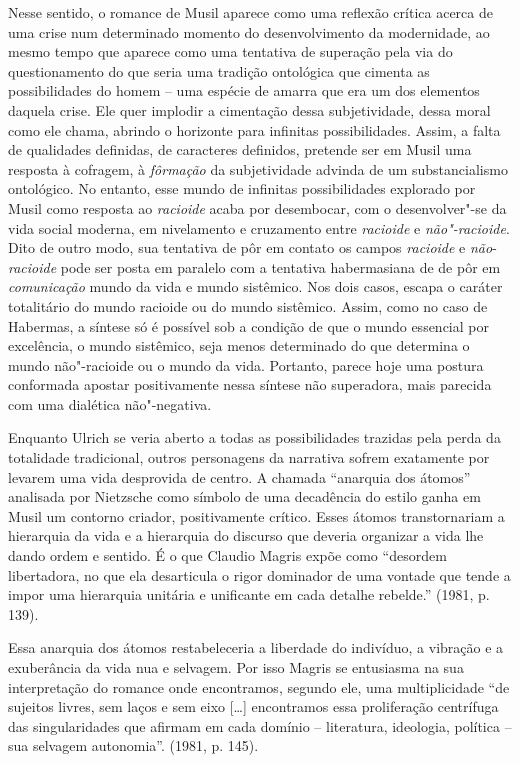 Nesse sentido, o romance de Musil aparece como uma reflexão crítica
acerca de uma crise num determinado momento do desenvolvimento da
modernidade, ao mesmo tempo que aparece como uma tentativa de superação
pela via do questionamento do que seria uma tradição ontológica que
cimenta as possibilidades do homem -- uma espécie de amarra que era um
dos elementos daquela crise. Ele quer implodir a cimentação dessa
subjetividade, dessa moral como ele chama, abrindo o horizonte para
infinitas possibilidades. Assim, a falta de qualidades definidas, de
caracteres definidos, pretende ser em Musil uma resposta à cofragem, à
\emph{fôrmação} da subjetividade advinda de um substancialismo
ontológico. No entanto, esse mundo de infinitas possibilidades explorado
por Musil como resposta ao \emph{racioide} acaba por desembocar, com o
desenvolver"-se da vida social moderna, em nivelamento e cruzamento entre
\emph{racioide} e \emph{não"-racioide}. Dito de outro modo, sua tentativa
de pôr em contato os campos \emph{racioide} e \emph{não}-\emph{racioide}
pode ser posta em paralelo com a tentativa habermasiana de de pôr em
\emph{comunicação} mundo da vida e mundo sistêmico. Nos dois casos,
escapa o caráter totalitário do mundo racioide ou do mundo sistêmico.
Assim, como no caso de Habermas, a síntese só é possível sob a condição
de que o mundo essencial por excelência, o mundo sistêmico, seja menos
determinado do que determina o mundo não"-racioide ou o mundo da vida.
Portanto, parece hoje uma postura conformada apostar positivamente nessa
síntese não superadora, mais parecida com uma dialética não"-negativa.

Enquanto Ulrich se veria aberto a todas as possibilidades trazidas pela
perda da totalidade tradicional, outros personagens da narrativa sofrem
exatamente por levarem uma vida desprovida de centro. A chamada
``anarquia dos átomos'' analisada por Nietzsche como símbolo de uma
decadência do estilo ganha em Musil um contorno criador, positivamente
crítico. Esses átomos transtornariam a hierarquia da vida e a hierarquia
do discurso que deveria organizar a vida lhe dando ordem e sentido. É o
que Claudio Magris expõe como ``desordem libertadora, no que ela
desarticula o rigor dominador de uma vontade que tende a impor uma
hierarquia unitária e unificante em cada detalhe rebelde.'' (1981, p.
139).

Essa anarquia dos átomos restabeleceria a liberdade do indivíduo, a
vibração e a exuberância da vida nua e selvagem. Por isso Magris se
entusiasma na sua interpretação do romance onde encontramos, segundo
ele, uma multiplicidade ``de sujeitos livres, sem laços e sem eixo
[\ldots{}] encontramos essa proliferação centrífuga das
singularidades que afirmam em cada domínio -- literatura, ideologia,
política -- sua selvagem autonomia''. (1981, p. 145).

